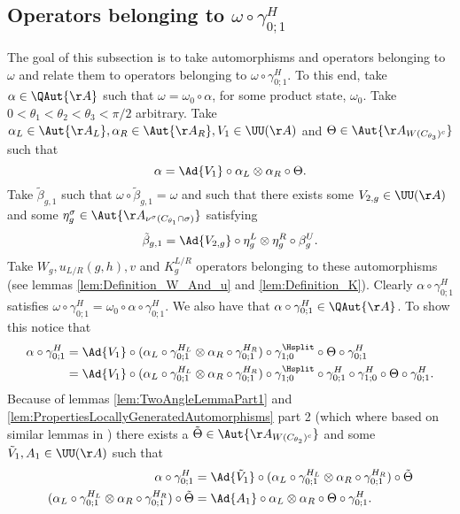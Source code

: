 \subsection{Operators belonging to \texorpdfstring{$\omega\circ\gamma^H_{0;1}$}{}}
The goal of this subsection is to take automorphisms and operators belonging to $\omega$ and relate them to operators belonging to $\omega\circ\gamma^H_{0;1}$. To this end, take $\alpha\in\QAut{\AA}$ such that $\omega=\omega_0\circ\alpha$, for some product state, $\omega_0$. Take $0<\theta_1<\theta_2<\theta_3<\pi/2$ arbitrary. Take $\alpha_L\in\Aut{\AA_L},\alpha_R\in\Aut{\AA_R},V_1\in\UU(\AA)$ and $\Theta\in\Aut{\AA_{W(C_{\theta_3})^c}}$ such that
\begin{equation}
	\alpha=\Ad{V_1}\circ\alpha_L\otimes\alpha_R\circ\Theta.
\end{equation}
Take $\tilde{\beta}_{g,1}$ such that $\omega\circ\tilde{\beta}_{g,1}=\omega$ and such that there exists some $V_{2,g}\in\UU(\AA)$ and some $\eta_g^{\sigma}\in\Aut{\AA_{\nu^\sigma(C_{\theta_1}\cap \sigma)}}$ satisfying
\begin{equation}
	\tilde{\beta}_{g,1}=\Ad{V_{2,g}}\circ\eta_{g}^L\otimes\eta_{g}^R\circ\beta_g^U.
\end{equation}
Take $W_g,u_{L/R}(g,h),v$ and $K_g^{L/R}$ operators belonging to these automorphisms (see lemmas \ref{lem:Definition_W_And_u} and \ref{lem:Definition_K}). Clearly $\alpha\circ\gamma^H_{0;1}$ satisfies $\omega\circ\gamma^{H}_{0;1}=\omega_0\circ\alpha\circ\gamma^{H}_{0;1}$. We also have that $\alpha\circ\gamma^{H}_{0;1}\in\QAut{\AA}$. To show this notice that
\begin{align}
	\alpha\circ\gamma^{H}_{0;1}&=\Ad{V_1}\circ(\alpha_L\circ\gamma^{H_L}_{0;1}\otimes\alpha_R\circ\gamma^{H_R}_{0;1})\circ\gamma^{\Hsplit}_{1;0}\circ\Theta\circ\gamma^H_{0;1}\\
	&=\Ad{V_1}\circ(\alpha_L\circ\gamma^{H_L}_{0;1}\otimes\alpha_R\circ\gamma^{H_R}_{0;1})\circ\gamma^{\Hsplit}_{1;0}\circ\gamma^{H}_{0;1}\circ\gamma^{H}_{1;0}\circ\Theta\circ\gamma^H_{0;1}.
\end{align}
Because of lemmas \ref{lem:TwoAngleLemmaPart1} and \ref{lem:PropertiesLocallyGeneratedAutomorphisms} part 2 (which where based on similar lemmas in \cite{Ogata2d}) there exists a $\tilde{\Theta}\in\Aut{\AA_{W(C_{\theta_2})^c}}$ and some $\tilde V_1,A_1\in\UU(\AA)$ such that
\begin{align}
	\alpha\circ\gamma^H_{0;1}&=\Ad{\tilde V_1}\circ(\alpha_L\circ\gamma^{H_L}_{0;1}\otimes\alpha_R\circ\gamma^{H_R}_{0;1})\circ\tilde\Theta\\
	\label{eq:ProofThatTheH2IndexIsInvariantUnderLGA's_Definition_A1}
	(\alpha_L\circ\gamma^{H_L}_{0;1}\otimes\alpha_R\circ\gamma^{H_R}_{0;1})\circ\tilde\Theta&=\Ad{A_1}\circ \alpha_L\otimes\alpha_R\circ\Theta\circ\gamma^{H}_{0;1}.
\end{align}
